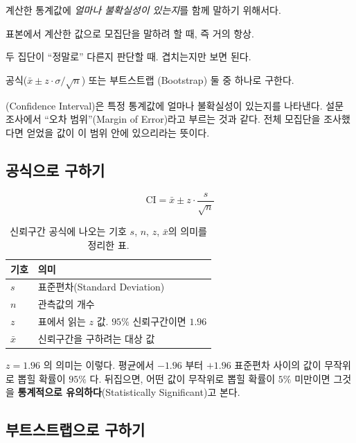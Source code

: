 \begin{inbrief}
  \item[Why] 계산한 통계값에 \emph{얼마나 불확실성이 있는지}를 함께 말하기 위해서다.
  \item[When] 표본에서 계산한 값으로 모집단을 말하려 할 때, 즉 거의 항상.
  \item[Where] 두 집단이 ``정말로'' 다른지 판단할 때. 겹치는지만 보면 된다.
  \item[How] 공식($\bar{x} \pm z \cdot \sigma/\sqrt{n}$) 또는 부트스트랩
             (Bootstrap) 둘 중 하나로 구한다.
\end{inbrief}

(Confidence Interval)은 특정 통계값에 얼마나 불확실성이 있는지를
나타낸다. 설문 조사에서 ``오차 범위''(Margin of Error)라고 부르는 것과 같다.
전체 모집단을 조사했다면 얻었을 값이 이 범위 안에 있으리라는 뜻이다.

\subsection{공식으로 구하기}

\[
  \mathrm{CI} = \bar{x} \pm z \cdot \frac{s}{\sqrt{n}}
\]

\begin{table}[H]\centering
\caption{신뢰구간 공식에 나오는 기호 $s$, $n$, $z$, $\bar{x}$의 의미를
정리한 표.}
\label{tab:viz-ci-symbols}
\begin{tabularx}{\linewidth}{@{}l X@{}}
\toprule
기호 & 의미 \\
\midrule
$s$ & 표준편차(Standard Deviation) \\
\midrule
$n$ & 관측값의 개수 \\
\midrule
$z$ & 표에서 읽는 $z$ 값. $95\%$ 신뢰구간이면 $1.96$ \\
\midrule
$\bar{x}$ & 신뢰구간을 구하려는 대상 값 \\
\bottomrule
\end{tabularx}
\end{table}

$z = 1.96$ 의 의미는 이렇다. 평균에서 $-1.96$ 부터 $+1.96$ 표준편차 사이의 값이
무작위로 뽑힐 확률이 $95\%$ 다. 뒤집으면, 어떤 값이 무작위로 뽑힐 확률이 $5\%$
미만이면 그것을 \textbf{통계적으로 유의하다}(Statistically Significant)고 본다.

\subsection{부트스트랩으로 구하기}
\label{subsec:bootstrap}

